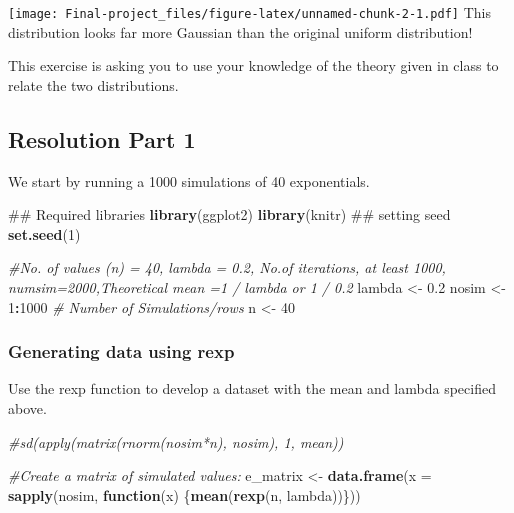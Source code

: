 \documentclass[]{article}
\newenvironment{Shaded}{\begin{snugshade}}{\end{snugshade}}
\newcommand{\KeywordTok}[1]{\textcolor[rgb]{0.13,0.29,0.53}{\textbf{#1}}}
\newcommand{\DataTypeTok}[1]{\textcolor[rgb]{0.13,0.29,0.53}{#1}}
\newcommand{\DecValTok}[1]{\textcolor[rgb]{0.00,0.00,0.81}{#1}}
\newcommand{\FloatTok}[1]{\textcolor[rgb]{0.00,0.00,0.81}{#1}}
\newcommand{\StringTok}[1]{\textcolor[rgb]{0.31,0.60,0.02}{#1}}
\newcommand{\CommentTok}[1]{\textcolor[rgb]{0.56,0.35,0.01}{\textit{#1}}}
\newcommand{\ControlFlowTok}[1]{\textcolor[rgb]{0.13,0.29,0.53}{\textbf{#1}}}
\newcommand{\OperatorTok}[1]{\textcolor[rgb]{0.81,0.36,0.00}{\textbf{#1}}}
\newcommand{\NormalTok}[1]{#1}
\begin{document}
\texttt{[image: Final-project\_files/figure-latex/unnamed-chunk-2-1.pdf]}
This distribution looks far more Gaussian than the original uniform
distribution!

This exercise is asking you to use your knowledge of the theory given in
class to relate the two distributions.

\subsection{\texorpdfstring{\textbf{Resolution Part
1}}{Resolution Part 1}}\label{resolution-part-1}

We start by running a 1000 simulations of 40 exponentials.

\begin{Shaded}
\begin{Highlighting}[]
\NormalTok{## Required libraries}
\KeywordTok{library}\NormalTok{(ggplot2)}
\KeywordTok{library}\NormalTok{(knitr)}
\NormalTok{## setting seed}
\KeywordTok{set.seed}\NormalTok{(}\DecValTok{1}\NormalTok{)}
\end{Highlighting}
\end{Shaded}

\begin{Shaded}
\begin{Highlighting}[]
\CommentTok{#No. of values (n) = 40, lambda = 0.2, No.of iterations, at least 1000, numsim=2000,Theoretical mean =1 / lambda or 1 / 0.2 }
\NormalTok{lambda <-}\StringTok{ }\FloatTok{0.2} 
\NormalTok{nosim <-}\StringTok{ }\DecValTok{1}\OperatorTok{:}\DecValTok{1000} \CommentTok{# Number of Simulations/rows}
\NormalTok{n <-}\StringTok{ }\DecValTok{40} 
\end{Highlighting}
\end{Shaded}

\subsubsection{Generating data using
rexp}\label{generating-data-using-rexp}

Use the rexp function to develop a dataset with the mean and lambda
specified above.

\begin{Shaded}
\begin{Highlighting}[]
\CommentTok{#sd(apply(matrix(rnorm(nosim*n), nosim), 1, mean))}

\CommentTok{#Create a matrix of simulated values:}
\NormalTok{e_matrix <-}\StringTok{ }\KeywordTok{data.frame}\NormalTok{(}\DataTypeTok{x =} \KeywordTok{sapply}\NormalTok{(nosim, }\ControlFlowTok{function}\NormalTok{(x) \{}\KeywordTok{mean}\NormalTok{(}\KeywordTok{rexp}\NormalTok{(n, lambda))\}))}
\end{Highlighting}
\end{Shaded}
\end{document}
